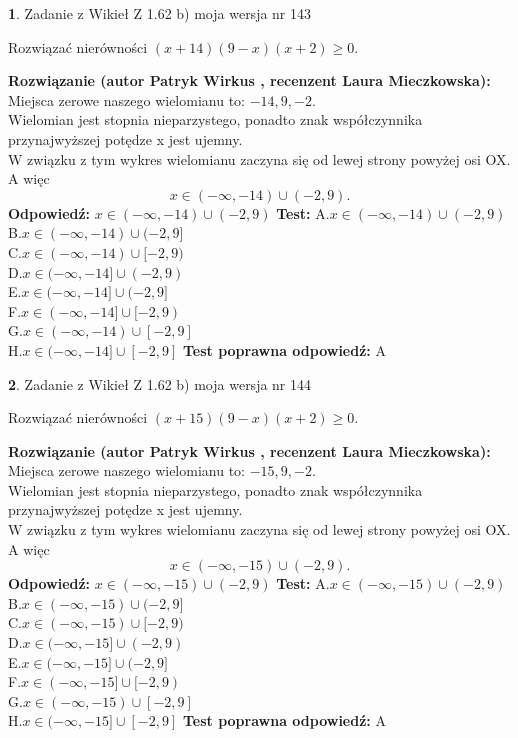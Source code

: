 \documentclass[12pt, a4paper]{article}
\theoremstyle{definition} %
\newtheorem{zad}{}
\newcommand{\zadStart}[1]{\begin{zad}#1\newline}
\newcommand{\zadStop}{\end{zad}}
\newcommand{\rozwStart}[2]{\noindent \textbf{Rozwiązanie (autor #1 , recenzent #2): }\newline}
\newcommand{\rozwStop}{\newline}
\newcommand{\odpStart}{\noindent \textbf{Odpowiedź:}\newline}
\newcommand{\odpStop}{\newline}
\newcommand{\testStart}{\noindent \textbf{Test:}\newline}
\newcommand{\testStop}{\newline}
\newcommand{\kluczStart}{\noindent \textbf{Test poprawna odpowiedź:}\newline}
\newcommand{\kluczStop}{\newline}
\begin{document}
\zadStart{Zadanie z Wikieł Z 1.62 b) moja wersja nr 143}

Rozwiązać nierówności $(x+14)(9-x)(x+2)\ge0$.
\zadStop
\rozwStart{Patryk Wirkus}{Laura Mieczkowska}
Miejsca zerowe naszego wielomianu to: $-14, 9, -2$.\\
Wielomian jest stopnia nieparzystego, ponadto znak współczynnika przy\linebreak najwyższej potędze x jest ujemny.\\ W związku z tym wykres wielomianu zaczyna się od lewej strony powyżej osi OX. A więc $$x \in (-\infty,-14) \cup (-2,9).$$
\rozwStop
\odpStart
$x \in (-\infty,-14) \cup (-2,9)$
\odpStop
\testStart
A.$x \in (-\infty,-14) \cup (-2,9)$\\
B.$x \in (-\infty,-14) \cup (-2,9]$\\
C.$x \in (-\infty,-14) \cup [-2,9)$\\
D.$x \in (-\infty,-14] \cup (-2,9)$\\
E.$x \in (-\infty,-14] \cup (-2,9]$\\
F.$x \in (-\infty,-14] \cup [-2,9)$\\
G.$x \in (-\infty,-14) \cup [-2,9]$\\
H.$x \in (-\infty,-14] \cup [-2,9]$
\testStop
\kluczStart
A
\kluczStop



\zadStart{Zadanie z Wikieł Z 1.62 b) moja wersja nr 144}

Rozwiązać nierówności $(x+15)(9-x)(x+2)\ge0$.
\zadStop
\rozwStart{Patryk Wirkus}{Laura Mieczkowska}
Miejsca zerowe naszego wielomianu to: $-15, 9, -2$.\\
Wielomian jest stopnia nieparzystego, ponadto znak współczynnika przy\linebreak najwyższej potędze x jest ujemny.\\ W związku z tym wykres wielomianu zaczyna się od lewej strony powyżej osi OX. A więc $$x \in (-\infty,-15) \cup (-2,9).$$
\rozwStop
\odpStart
$x \in (-\infty,-15) \cup (-2,9)$
\odpStop
\testStart
A.$x \in (-\infty,-15) \cup (-2,9)$\\
B.$x \in (-\infty,-15) \cup (-2,9]$\\
C.$x \in (-\infty,-15) \cup [-2,9)$\\
D.$x \in (-\infty,-15] \cup (-2,9)$\\
E.$x \in (-\infty,-15] \cup (-2,9]$\\
F.$x \in (-\infty,-15] \cup [-2,9)$\\
G.$x \in (-\infty,-15) \cup [-2,9]$\\
H.$x \in (-\infty,-15] \cup [-2,9]$
\testStop
\kluczStart
A
\kluczStop
\end{document}
